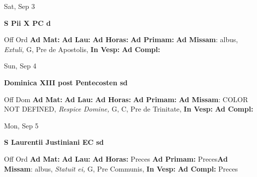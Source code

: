 \documentclass[10pt]{book}
\begin{document}
\begin{center}
\begin{minipage}{3.5in}
\vspace{2em}
\begin{center}Sat, Sep 3
\end{center}
\textbf{ \large S Pii X PC
\textnormal{\normalsize d}}

\begin{justify}Off Ord
\textbf{Ad Mat: }
\textbf{Ad Lau: }
\textbf{Ad Horas: }
\textbf{Ad Primam: }\textbf{Ad Missam}: albus, \textit{Extuli,} G, Pre de Apostolis, 
\textbf{In Vesp: }
\textbf{Ad Compl: }
\end{justify}
\end{minipage}
\end{center}

\begin{center}
\begin{minipage}{3.5in}
\vspace{2em}
\begin{center}Sun, Sep 4
\end{center}
\textbf{ \large Dominica XIII post Pentecosten
\textnormal{\normalsize sd}}

\begin{justify}Off Dom
\textbf{Ad Mat: }
\textbf{Ad Lau: }
\textbf{Ad Horas: }
\textbf{Ad Primam: }\textbf{Ad Missam}: COLOR NOT DEFINED, \textit{Respice Domine,} G, C, Pre de Trinitate, 
\textbf{In Vesp: }
\textbf{Ad Compl: }
\end{justify}
\end{minipage}
\end{center}

\begin{center}
\begin{minipage}{3.5in}
\vspace{2em}
\begin{center}Mon, Sep 5
\end{center}
\textbf{ \large S Laurentii Justiniani EC
\textnormal{\normalsize sd}}

\begin{justify}Off Ord
\textbf{Ad Mat: }
\textbf{Ad Lau: }
\textbf{Ad Horas: }Preces
\textbf{Ad Primam: }Preces\textbf{Ad Missam}: albus, \textit{Statuit ei,} G, Pre Communis, 
\textbf{In Vesp: }
\textbf{Ad Compl: }Preces
\end{justify}
\end{minipage}
\end{center}
\end{document}
